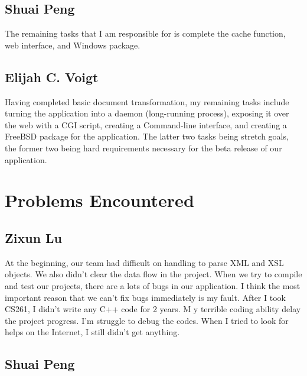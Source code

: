 \subsection{Shuai Peng}

The remaining tasks that I am responsible for is complete the cache function, web interface, and Windows package.

\subsection{Elijah C. Voigt}

Having completed basic document transformation, my remaining tasks include turning the application into a daemon (long-running process), exposing it over the web with a CGI script, creating a Command-line interface, and creating a FreeBSD package for the application.
The latter two tasks being stretch goals, the former two being hard requirements necessary for the beta release of our application.

\section{Problems Encountered}

\subsection{Zixun Lu}

At the beginning, our team had difficult on handling to parse XML and XSL objects.
We also didn’t clear the data flow in the project.
When we try to compile and test our projects, there are a lots of bugs in our application. 
I think the most important reason that we can’t fix bugs immediately is my fault. 
After I took CS261, I didn’t write any C++ code for 2 years. M
y terrible coding ability delay the project progress. I’m struggle to debug the codes. 
When I tried to look for helps on the Internet, I still didn’t get anything. 

\subsection{Shuai Peng}

